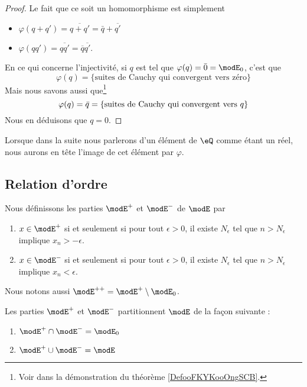 \begin{proof}
    Le fait que ce soit un homomorphisme est simplement 
    \begin{itemize}
        \item \( \varphi(q+q')=\overline{ q+q' }=\bar q+\overline{ q' }\)
        \item \( \varphi(qq')=\overline{ qq' }=\overline{ q }\overline{ q' }\).
    \end{itemize}
    En ce qui concerne l'injectivité, si \( q\) est tel que \( \varphi(q)=\bar 0=\modE_0\), c'est que
    \begin{equation}
        \varphi(q)=\{ \text{suites de Cauchy qui convergent vers zéro} \}
    \end{equation}
    Mais nous savons aussi que\footnote{Voir dans la démonstration du théorème \ref{DefooFKYKooOngSCB}.}
    \begin{equation}
        \varphi(q)=\bar q=\{ \text{suites de Cauchy qui convergent vers \( q\)} \}
    \end{equation}
    Nous en déduisons que \( q=0\).
\end{proof}
Lorsque dans la suite nous parlerons d'un élément de \( \eQ\) comme étant un réel, nous aurons en tête l'image de cet élément par \( \varphi\).

\subsection{Relation d'ordre}

Nous définissons les parties \( \modE^+\) et \( \modE^-\) de \( \modE\) par
\begin{enumerate}
    \item
        \( x\in  \modE^+\) si et seulement si pour tout \( \epsilon>0\), il existe \( N_{\epsilon}\) tel que \( n>N_{\epsilon}\) implique \( x_n>-\epsilon\).
    \item
        \( x\in  \modE^-\) si et seulement si pour tout \( \epsilon>0\), il existe \( N_{\epsilon}\) tel que \( n>N_{\epsilon}\) implique \( x_n<\epsilon\).
\end{enumerate}
Nous notons aussi \( \modE^{++}=\modE^+\setminus\modE_0\).

\begin{lemma}
    Les parties \( \modE^+\) et \( \modE^-\) partitionnent \( \modE\) de la façon suivante :
    \begin{enumerate}
        \item
            \( \modE^+\cap\modE^-=\modE_0\)
        \item
            \( \modE^+\cup\modE^-=\modE\)
    \end{enumerate}
\end{lemma}

